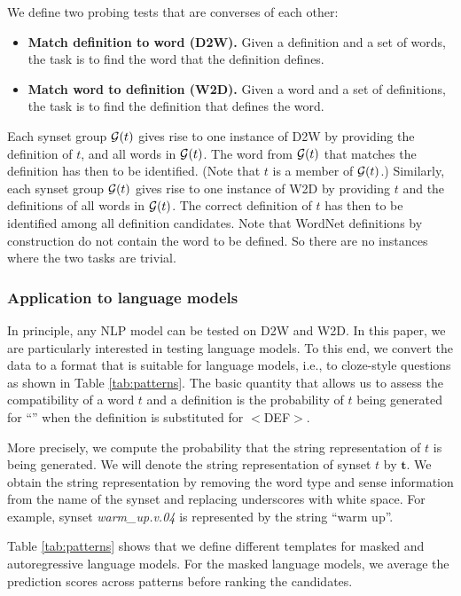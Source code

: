 \documentclass[11pt,a4paper]{article}
\begin{document}
We define two probing tests that are converses of each other:
\begin{itemize}
  \item \textbf{Match definition to word (D2W).} Given a
    definition and a set of words, the task is to find the
    word that the definition defines.
  \item \textbf{Match word to definition (W2D).} Given a
    word and a set of definitions, the task is to find the
    definition that defines the word.
    \end{itemize}
Each synset group ${\cal G}(t)$ gives rise to one instance
of D2W by providing the definition of $t$, and all words in
${\cal G}(t)$. The word from ${\cal G}(t)$ that matches the
definition has then to be identified. (Note that $t$ is a
member of ${\cal G}(t)$.)
Similarly, each synset group ${\cal G}(t)$ gives rise to one instance
of W2D by providing $t$ and the definitions of all words in
${\cal G}(t)$. The
correct definition  of $t$ has then to be identified among
all definition  candidates. Note that WordNet definitions by
construction do not contain the word to be defined. So there
are no instances where the two tasks are trivial.

\subsubsection{Application to language models}
In principle, any NLP model can be tested on D2W and W2D.
In this paper, we are particularly
interested in testing language models. To this end, we 
convert the data to a format that is suitable for language
models, i.e., to cloze-style questions as
shown in Table
\ref{tab:patterns}. The basic quantity that allows us to
assess the compatibility of a word $t$ and a definition is the
probability of
$t$ being generated for 
``\underline{\hspace{3mm}}'' when the definition is substituted for $<$DEF$>$.

More precisely, we compute the probability that the string
representation of $t$ is being generated.
We will denote the string representation of synset $t$ by
$\bm{t}$. 
We obtain the string representation by removing
the word type and sense information from the name of the
synset and replacing underscores with white space. For
example, synset \emph{warm\_up.v.04}
is represented by
the string ``warm
up''.

Table \ref{tab:patterns} shows that we define different templates for masked and autoregressive language models.
For the masked language models, we average the prediction scores across patterns before ranking the candidates.
\end{document}
